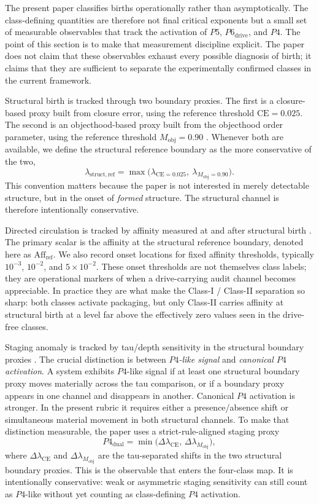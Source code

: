 \documentclass[11pt]{article}
\begin{document}
The present paper classifies births operationally rather than asymptotically. The class-defining quantities are therefore not final critical exponents but a small set of measurable observables that track the activation of $P5$, $P6_{\mathrm{drive}}$, and $P4$. The point of this section is to make that measurement discipline explicit. The paper does not claim that these observables exhaust every possible diagnosis of birth; it claims that they are sufficient to separate the experimentally confirmed classes in the current framework.

Structural birth is tracked through two boundary proxies. The first is a closure-based proxy built from closure error, using the reference threshold $\mathrm{CE}=0.025$. The second is an objecthood-based proxy built from the objecthood order parameter, using the reference threshold $M_{\mathrm{obj}}=0.90$ \cite{marino_scholl_2005,wang_wang_kubota_2004}. Whenever both are available, we define the structural reference boundary as the more conservative of the two,
\[
\lambda_{\mathrm{struct,ref}}
=
\max\!\bigl(\lambda_{\mathrm{CE}=0.025},\ \lambda_{M_{\mathrm{obj}}=0.90}\bigr).
\]
This convention matters because the paper is not interested in merely detectable structure, but in the onset of \emph{formed} structure. The structural channel is therefore intentionally conservative.

Directed circulation is tracked by affinity measured at and after structural birth \cite{liang_pigolotti_2023,seifert_2012}. The primary scalar is the affinity at the structural reference boundary, denoted here as $\mathrm{Aff}_{\mathrm{ref}}$. We also record onset locations for fixed affinity thresholds, typically $10^{-3}$, $10^{-2}$, and $5\times 10^{-2}$. These onset thresholds are not themselves class labels; they are operational markers of when a drive-carrying audit channel becomes appreciable. In practice they are what make the Class-I / Class-II separation so sharp: both classes activate packaging, but only Class-II carries affinity at structural birth at a level far above the effectively zero values seen in the drive-free classes.

Staging anomaly is tracked by tau/depth sensitivity in the structural boundary proxies \cite{landim_2019,defenu_2021}. The crucial distinction is between \emph{$P4$-like signal} and \emph{canonical $P4$ activation}. A system exhibits $P4$-like signal if at least one structural boundary proxy moves materially across the tau comparison, or if a boundary proxy appears in one channel and disappears in another. Canonical $P4$ activation is stronger. In the present rubric it requires either a presence/absence shift or simultaneous material movement in both structural channels. To make that distinction measurable, the paper uses a strict-rule-aligned staging proxy
\[
P4_{\mathrm{dual}}=\min\!\bigl(\Delta\lambda_{\mathrm{CE}},\,\Delta\lambda_{M_{\mathrm{obj}}}\bigr),
\]
where $\Delta\lambda_{\mathrm{CE}}$ and $\Delta\lambda_{M_{\mathrm{obj}}}$ are the tau-separated shifts in the two structural boundary proxies. This is the observable that enters the four-class map. It is intentionally conservative: weak or asymmetric staging sensitivity can still count as $P4$-like without yet counting as class-defining $P4$ activation.
\end{document}
